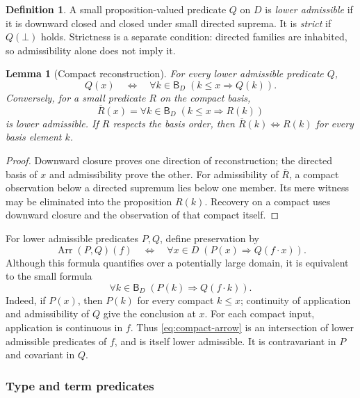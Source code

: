 \documentclass[11pt,a4paper]{article}
\newtheorem{lemma}[theorem]{Lemma}
\theoremstyle{definition}
\newtheorem{definition}[theorem]{Definition}
\theoremstyle{remark}
\newcommand{\B}{\mathsf B}
\newcommand{\appl}{\mathbin{\cdot}}
\begin{document}
\begin{definition}
A small proposition-valued predicate $Q$ on $D$ is \emph{lower admissible}
if it is downward closed and closed under small directed suprema.
It is \emph{strict} if $Q(\bot)$ holds. Strictness is a separate condition:
directed families are inhabited, so admissibility alone does not imply it.
\end{definition}

\begin{lemma}[Compact reconstruction]\label{lem:reconstruction}
For every lower admissible predicate $Q$,
\[
 Q(x)\quad\Longleftrightarrow\quad
 \forall k\in\B_D\;(k\leq x\Longrightarrow Q(k)).
\]
Conversely, for a small predicate $R$ on the compact basis,
\[
 \overline R(x)=\forall k\in\B_D\;(k\leq x\Longrightarrow R(k))
\]
is lower admissible. If $R$ respects the basis order, then
$\overline R(k)\Longleftrightarrow R(k)$ for every basis element $k$.
\end{lemma}
\begin{proof}
Downward closure proves one direction of reconstruction; the directed
basis of $x$ and admissibility prove the other. For admissibility of
$\overline R$, a compact observation below a directed supremum lies below
one member. Its mere witness may be eliminated into the proposition
$R(k)$. Recovery on a compact uses downward closure and the observation
of that compact itself.
\end{proof}

For lower admissible predicates $P,Q$, define preservation by
\[
 \operatorname{Arr}(P,Q)(f)
 \quad\Longleftrightarrow\quad
 \forall x\in D\;(P(x)\Longrightarrow Q(f\appl x)).
\]
Although this formula quantifies over a potentially large domain, it is
equivalent to the small formula
\begin{equation}\label{eq:compact-arrow}
 \forall k\in\B_D\;(P(k)\Longrightarrow Q(f\appl k)).
\end{equation}
Indeed, if $P(x)$, then $P(k)$ for every compact $k\leq x$; continuity
of application and admissibility of $Q$ give the conclusion at $x$.
For each compact input, application is continuous in $f$. Thus
\eqref{eq:compact-arrow} is an intersection of lower admissible predicates
of $f$, and is itself lower admissible. It is contravariant in $P$ and
covariant in $Q$.

\subsubsection{Type and term predicates}
\end{document}
